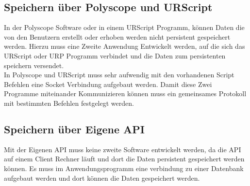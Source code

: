 \subsection{Speichern über Polyscope und URScript}
\label{sec:save_data_polyscope_kon}

In der Polyscope Software oder in einem URScript Programm, können Daten die von den Benutzern erstellt oder erhoben werden nicht persistent
gespeichert werden. Hierzu muss eine Zweite Anwendung Entwickelt werden, auf die sich das URScript oder URP Programm verbindet und die Daten zum persistenten speichern versendet.
\\
In Polyscope und URScript muss sehr aufwendig mit den vorhandenen Script Befehlen eine Socket Verbindung aufgebaut werden.
Damit diese Zwei Programme miteinander Kommunizieren können muss ein gemeinsames Protokoll mit bestimmten Befehlen festgelegt werden.

\subsection{Speichern über Eigene API}
\label{save_data_own_api_kon}

Mit der Eigenen API muss keine zweite Software entwickelt werden, da die API auf einem Client Rechner läuft und dort die Daten persistent gespeichert werden können. Es muss im Anwendungsprogramm eine verbindung zu einer Datenbank aufgebaut werden und dort können die Daten gespeichert werden.